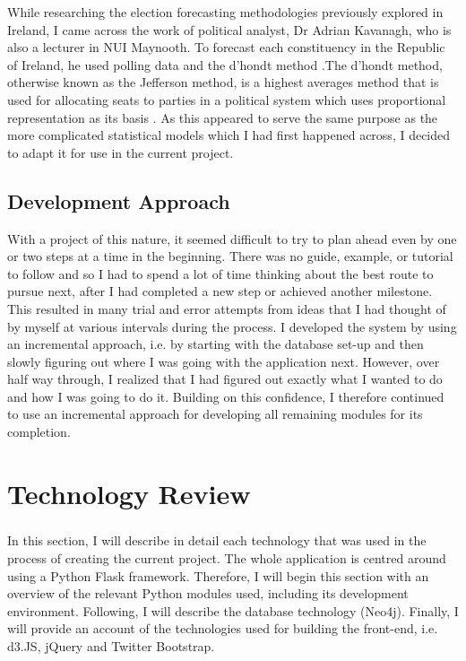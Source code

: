 While researching the election forecasting methodologies previously explored in Ireland, I came across the work of political analyst, Dr Adrian Kavanagh, who is also a lecturer in NUI Maynooth. To forecast each constituency in the Republic of Ireland, he used polling data and the d’hondt method \cite{adrian}.The d’hondt method, otherwise known as the Jefferson method, is a highest averages method that is used for allocating seats to parties in a political system which uses proportional representation as its basis \cite{dhondt}.  As this appeared to serve the same purpose as the more complicated statistical models which I had first happened across,  I decided to adapt it for use in the current project.
\section{Development Approach}
With a project of this nature, it seemed difficult to try to plan ahead even by one or two steps at a time in the beginning.  There was no guide, example, or tutorial to follow and so I had to spend a lot of time thinking about the best route to pursue next, after I had completed a new step or achieved another milestone. This resulted in many trial and error attempts from ideas that I had thought of by myself at various intervals during the process. I developed the system by using an incremental approach, i.e. by starting with the database set-up and then slowly figuring out where I was going with the application next. However, over half way through, I realized that I had figured out exactly what I wanted to do and how I was going to do it. Building on this confidence, I therefore continued to use an incremental approach for developing all remaining modules for its completion.

\chapter{Technology Review}
\paragraph{}
In this section, I will describe in detail each technology that was used in the process of creating the current project. The whole application is centred around using a Python Flask framework. Therefore, I will begin this section with an overview of the relevant Python modules used, including its development environment. Following, I will describe the database technology (Neo4j). Finally, I will provide an account of the technologies used for building the front-end, i.e. d3.JS, jQuery and Twitter Bootstrap.


